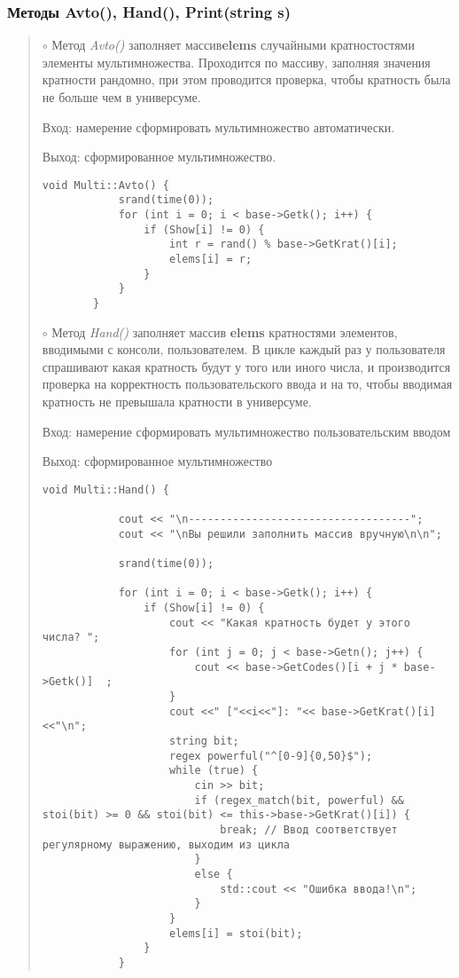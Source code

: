 \documentclass[10pt,a4paper,final]{article} %
\begin{document}
\subsubsection {Методы Avto(), Hand(), Print(string s)}
\begin{quote}
	$\circ$ Метод \textit{Avto()} заполняет массив\textbf{elems} случайными кратностостями элементы мультимножества. Проходится по массиву, заполняя значения кратности рандомно, при этом проводится проверка, чтобы кратность была не больше чем в универсуме. 
	\par Вход: намерение сформировать мультимножество автоматически.
	\par Выход: сформированное мультимножество.
	
	\begin{lstlisting}[caption={Метод Avto}]
		void Multi::Avto() {
			srand(time(0));
			for (int i = 0; i < base->Getk(); i++) {
				if (Show[i] != 0) {
					int r = rand() % base->GetKrat()[i];
					elems[i] = r;
				}
			}
		}
	\end{lstlisting}
	
	
	$\circ$ Метод \textit{Hand()} заполняет массив \textbf{elems} кратностями элементов, вводимыми с консоли, пользователем. В цикле каждый раз у пользователя спрашивают какая кратность будут у того или иного числа, и производится проверка на корректность пользовательского ввода и на то, чтобы вводимая кратность не превышала кратности в универсуме.
	\par Вход: намерение  сформировать мультимножество пользовательским вводом
	\par Выход: сформированное мультимножество
	
	\begin{lstlisting}[caption={Метод Hand}]
		void Multi::Hand() {
			
			cout << "\n-----------------------------------";
			cout << "\nВы решили заполнить массив вручную\n\n";
			
			srand(time(0));
			
			for (int i = 0; i < base->Getk(); i++) {
				if (Show[i] != 0) {
					cout << "Какая кратность будет у этого числа? ";
					for (int j = 0; j < base->Getn(); j++) {
						cout << base->GetCodes()[i + j * base->Getk()]  ;
					}
					cout <<" ["<<i<<"]: "<< base->GetKrat()[i]<<"\n";
					string bit;
					regex powerful("^[0-9]{0,50}$");
					while (true) {
						cin >> bit;
						if (regex_match(bit, powerful) && stoi(bit) >= 0 && stoi(bit) <= this->base->GetKrat()[i]) {
							break; // Ввод соответствует регулярному выражению, выходим из цикла
						}
						else {
							std::cout << "Ошибка ввода!\n";
						}
					}
					elems[i] = stoi(bit);
				}
			}
	\end{lstlisting}
	

\end{quote}
\end{document}
